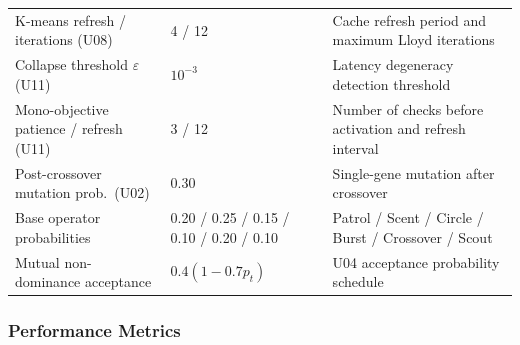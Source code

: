 \documentclass[11pt,a4paper]{article}
\begin{document}
\begin{table}[H]
\begin{tabularx}{\linewidth}{l l X}
K-means refresh / iterations (U08) & 4 / 12
  & Cache refresh period and maximum Lloyd iterations \\
Collapse threshold $\varepsilon$ (U11) & $10^{-3}$
  & Latency degeneracy detection threshold \\
Mono-objective patience / refresh (U11) & 3 / 12
  & Number of checks before activation and refresh interval \\
Post-crossover mutation prob.\ (U02) & 0.30
  & Single-gene mutation after crossover \\
Base operator probabilities & 0.20 / 0.25 / 0.15 / 0.10 / 0.20 / 0.10
  & Patrol / Scent / Circle / Burst / Crossover / Scout \\
Mutual non-dominance acceptance & $0.4(1-0.7p_t)$
  & U04 acceptance probability schedule \\
\bottomrule
\end{tabularx}
\end{table}

\subsubsection{Performance Metrics}
\label{sec:design_metrics}
\end{document}
